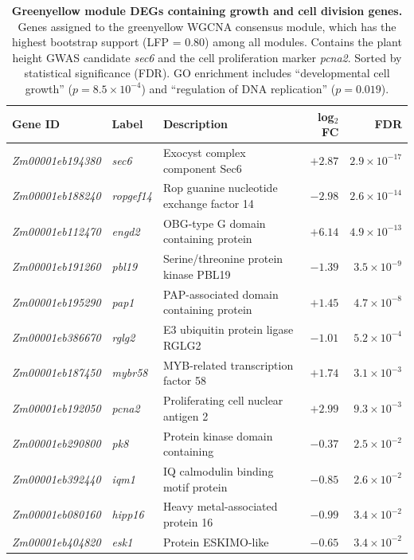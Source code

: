 \documentclass[9pt,twocolumn,twoside]{rilabRxiv}
\begin{document}
\begin{table}[!ht]
\caption{\textbf{Greenyellow module DEGs containing growth and cell division genes.} Genes assigned to the greenyellow WGCNA consensus module, which has the highest bootstrap support (LFP = 0.80) among all modules. Contains the plant height GWAS candidate \textit{sec6} and the cell proliferation marker \textit{pcna2}. Sorted by statistical significance (FDR). GO enrichment includes ``developmental cell growth'' ($p = 8.5 \times 10^{-4}$) and ``regulation of DNA replication'' ($p = 0.019$).}
\label{tab::greenyellow_module}
\centering
\small
\begin{tabular}{@{}lllrr@{}}
\toprule
\textbf{Gene ID} & \textbf{Label} & \textbf{Description} & \textbf{log$_2$FC} & \textbf{FDR} \\
\midrule
\textit{Zm00001eb194380} & \textit{sec6} & Exocyst complex component Sec6 & $+2.87$ & $2.9 \times 10^{-17}$ \\
\textit{Zm00001eb188240} & \textit{ropgef14} & Rop guanine nucleotide exchange factor 14 & $-2.98$ & $2.6 \times 10^{-14}$ \\
\textit{Zm00001eb112470} & \textit{engd2} & OBG-type G domain containing protein & $+6.14$ & $4.9 \times 10^{-13}$ \\
\textit{Zm00001eb191260} & \textit{pbl19} & Serine/threonine protein kinase PBL19 & $-1.39$ & $3.5 \times 10^{-9}$ \\
\textit{Zm00001eb195290} & \textit{pap1} & PAP-associated domain containing protein & $+1.45$ & $4.7 \times 10^{-8}$ \\
\textit{Zm00001eb386670} & \textit{rglg2} & E3 ubiquitin protein ligase RGLG2 & $-1.01$ & $5.2 \times 10^{-4}$ \\
\textit{Zm00001eb187450} & \textit{mybr58} & MYB-related transcription factor 58 & $+1.74$ & $3.1 \times 10^{-3}$ \\
\textit{Zm00001eb192050} & \textit{pcna2} & Proliferating cell nuclear antigen 2 & $+2.99$ & $9.3 \times 10^{-3}$ \\
\textit{Zm00001eb290800} & \textit{pk8} & Protein kinase domain containing & $-0.37$ & $2.5 \times 10^{-2}$ \\
\textit{Zm00001eb392440} & \textit{iqm1} & IQ calmodulin binding motif protein & $-0.85$ & $2.6 \times 10^{-2}$ \\
\textit{Zm00001eb080160} & \textit{hipp16} & Heavy metal-associated protein 16 & $-0.99$ & $3.4 \times 10^{-2}$ \\
\textit{Zm00001eb404820} & \textit{esk1} & Protein ESKIMO-like & $-0.65$ & $3.4 \times 10^{-2}$ \\

\end{tabular}
\end{table}
\end{document}
